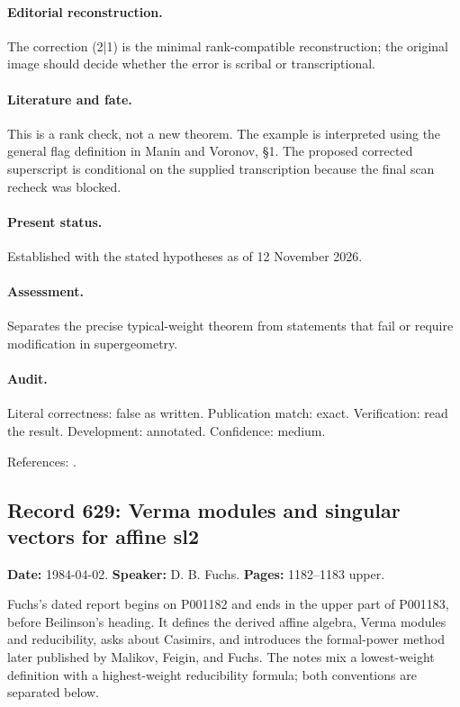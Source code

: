 \paragraph{Editorial reconstruction.} The correction (2|1) is the minimal rank-compatible reconstruction; the original image should decide whether the error is scribal or transcriptional.

\paragraph{Literature and fate.} This is a rank check, not a new theorem. The example is interpreted using the general flag definition in Manin and Voronov, \S1. The proposed corrected superscript is conditional on the supplied transcription because the final scan recheck was blocked.

\paragraph{Present status.} Established with the stated hypotheses as of 12 November 2026.

\paragraph{Assessment.} Separates the precise typical-weight theorem from statements that fail or require modification in supergeometry.

\paragraph{Audit.} Literal correctness: false as written. Publication match: exact. Verification: read the result. Development: annotated. Confidence: medium.

\noindent References: \citep{maninvoronov1988supercell}.\par

\subsection{Record 629: Verma modules and singular vectors for affine sl2}

\label{talk:629}

\noindent\textbf{Date:} 1984-04-02. \textbf{Speaker:} D. B. Fuchs. \textbf{Pages:} 1182--1183 upper.\par

Fuchs’s dated report begins on P001182 and ends in the upper part of P001183, before Beilinson’s heading. It defines the derived affine algebra, Verma modules and reducibility, asks about Casimirs, and introduces the formal-power method later published by Malikov, Feigin, and Fuchs. The notes mix a lowest-weight definition with a highest-weight reducibility formula; both conventions are separated below.

